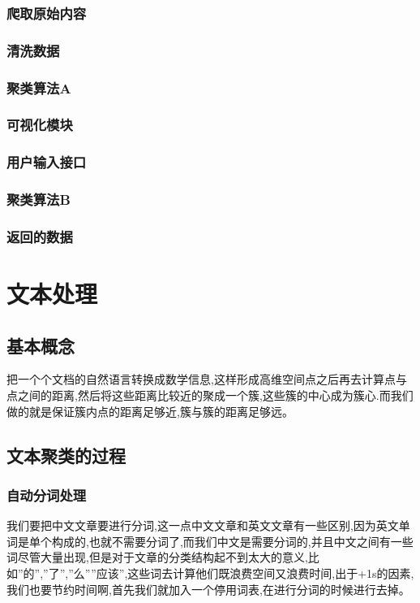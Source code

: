 \documentclass[UTF8]{ctexart}
\begin{document}
\subsubsection{爬取原始内容}

\subsubsection{清洗数据}

\subsubsection {聚类算法A}

\subsubsection{可视化模块}

\subsubsection{用户输入接口}

\subsubsection{聚类算法B}

\subsubsection{返回的数据}

\section {文本处理}
\subsection{基本概念}
把一个个文档的自然语言转换成数学信息,这样形成高维空间点之后再去计算点与点之间的距离,然后将这些距离比较近的聚成一个簇,这些簇的中心成为簇心.而我们做的就是保证簇内点的距离足够近,簇与簇的距离足够远。
\cite{zhihu1}

\subsection{文本聚类的过程}

\subsubsection{自动分词处理}
我们要把中文文章要进行分词,这一点中文文章和英文文章有一些区别,因为英文单词是单个构成的,也就不需要分词了,而我们中文是需要分词的,并且中文之间有一些词尽管大量出现,但是对于文章的分类结构起不到太大的意义,比如”的”,”了”,”么””应该”,这些词去计算他们既浪费空间又浪费时间,出于+1s的因素,我们也要节约时间啊,首先我们就加入一个停用词表,在进行分词的时候进行去掉。\cite{zhihu1}
\end{document}
